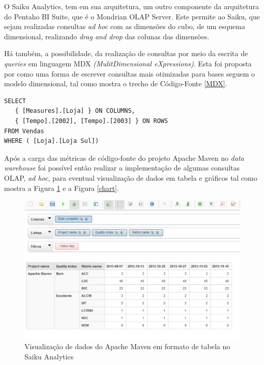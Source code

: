O Saiku Analytics, tem em sua arquitetura, um outro componente da arquitetura do Pentaho BI Suite, que é o Mondrian OLAP Server. Este permite ao Saiku, que sejam realizadas consultas \textit{ad hoc} com as dimensões do cubo, de um esquema dimensional, realizando \textit{drag and drop} das colunas das dimensões.

Há também, a possibilidade, da realização de consultas por meio da escrita de \textit{queries} em linguagem MDX \textit{(MulitDimensional eXpressions)}. Esta foi proposta por  como uma forma de escrever consultas mais otimizadas para bases seguem o modelo dimensional, tal como mostra o trecho de Código-Fonte \ref{MDX}.




\begin{center}
\begin{minipage}{0.5\textwidth}

\begin{lstlisting}[caption=Exemplo de \textit{Query} em linguagem MDX, label=MDX]
 SELECT
   { [Measures].[Loja] } ON COLUMNS,
   { [Tempo].[2002], [Tempo].[2003] } ON ROWS
FROM Vendas
WHERE ( [Loja].[Loja Sul]) 

\end{lstlisting}
\end{minipage}
\end{center}
\FloatBarrier


Após a carga das métricas de código-fonte do projeto Apache Maven no \textit{data warehouse} foi possível então realizar a implementação de algumas consultas OLAP, \textit{ad hoc}, para eventual visualização de dados em tabela e gráficos tal como mostra a Figura \ref{table} e a Figura \ref{chart}. 



\begin{figure}[ht!]
\centering
\includegraphics[keepaspectratio=false,scale=0.83]{figuras/indicadores.eps}
\caption{Visualização de dados do Apache Maven em formato de tabela no Saiku Analytics}
\label{table}
\end{figure}
\FloatBarrier
 



